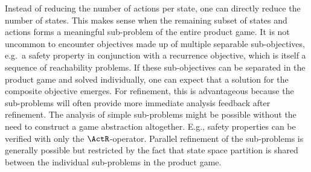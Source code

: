 Instead of reducing the number of actions per state, one can directly reduce the number of states.
This makes sense when the remaining subset of states and actions forms a meaningful sub-problem of the entire product game.
It is not uncommon to encounter objectives made up of multiple separable sub-objectives, e.g.\ a safety property in conjunction with a recurrence objective, which is itself a sequence of reachability problems.
If these sub-objectives can be separated in the product game and solved individually, one can expect that a solution for the composite objective emerges.
For refinement, this is advantageous because the sub-problems will often provide more immediate analysis feedback after refinement.
The analysis of simple sub-problems might be possible without the need to construct a game abstraction altogether.
E.g., safety properties can be verified with only the $\ActR$-operator.
Parallel refinement of the sub-problems is generally possible but restricted by the fact that state space partition is shared between the individual sub-problems in the product game.

